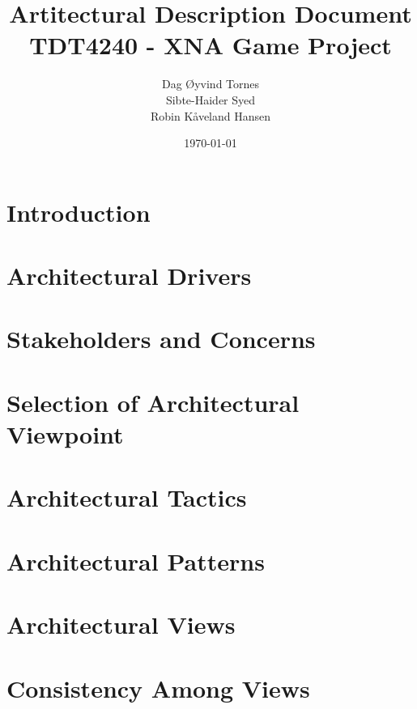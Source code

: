 \documentclass[titlepage,a4paper,11pt]{article}
\date{\today}
\begin{document}
\title{Artitectural Description Document\\
 		TDT4240 - XNA Game Project}

\author{Dag Øyvind Tornes\\
 		Sibte-Haider Syed\\ 
		Robin Kåveland Hansen\\}
\maketitle

\pagestyle{empty}
\tableofcontents
\clearpage
\pagestyle{plain}

\section{Introduction}


\section{Architectural Drivers}


\section{Stakeholders and Concerns}


\section{Selection of Architectural Viewpoint}


\section{Architectural Tactics}


\section{Architectural Patterns}


\section{Architectural Views}


\section{Consistency Among Views}

\end{document}
